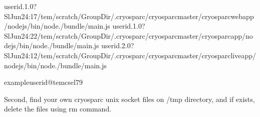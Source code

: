 \documentclass[a4paper,10pt,english]{sphinxmanual}
\begin{document}
\begin{sphinxVerbatim}[commandchars=\\\{\}]
userid.1.0?SlJun24:17/tem/scratch/\PYGZlt{}GroupDir\PYGZgt{}/.cryosparc/cryosparc\PYGZus{}master/cryosparc\PYGZus{}webapp/nodejs/bin/node./bundle/main.js
userid.1.0?SlJun24:22/tem/scratch/\PYGZlt{}GroupDir\PYGZgt{}/.cryosparc/cryosparc\PYGZus{}master/cryosparc\PYGZus{}app/nodejs/bin/node./bundle/main.js
userid.2.0?SlJun24:12/tem/scratch/\PYGZlt{}GroupDir\PYGZgt{}/.cryosparc/cryosparc\PYGZus{}master/cryosparc\PYGZus{}liveapp/nodejs/bin/node./bundle/main.js

exampleuserid@tem\PYGZhy{}cs\PYGZhy{}el7\PYGZdl{}\PYGZgt{}\PYGZhy{}9
\end{sphinxVerbatim}

\sphinxAtStartPar
Second, find your own cryosparc unix socket files on /tmp directory, and if exists, delete the files using rm command.
\end{document}
